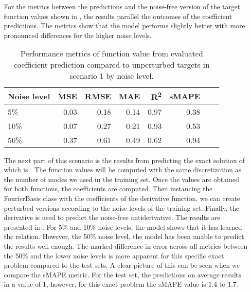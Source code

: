 For the metrics between the predictions and the noise-free version of the target function values shown in , the results parallel the outcomes of the coefficient predictions. The metrics show that the model performs slightly better with more pronounced differences for the higher noise levels.
\begin{table}[H]
  \caption{Performance metrics of function value from evaluated coefficient prediction compared to unperturbed targets in scenario 1 by noise level.}\label{table:scenario_1_clean_function_metrics}
  \centering
  \begin{tabular}{lrrrrrrr}
    \toprule
    Noise level & MSE  & RMSE & MAE  & R\textsuperscript{2} & sMAPE \\
    \midrule
    5\%         & 0.03 & 0.18 & 0.14 & 0.97                 & 0.38  \\
    10\%        & 0.07 & 0.27 & 0.21 & 0.93                 & 0.53  \\
    50\%        & 0.37 & 0.61 & 0.49 & 0.62                 & 0.94  \\
    \bottomrule
  \end{tabular}
\end{table}

The next part of this scenario is the results from predicting the exact solution of  which is . The function values will be computed with the same discretization as the number of modes we used in the training set. Once the values are obtained for both functions, the coefficients are computed. Then instancing the FourierBasis class with the coefficients of the derivative function, we can create perturbed versions according to the noise levels of the training set. Finally, the derivative is used to predict the noise-free antiderivative. The results are presented in . For 5\% and 10\% noise levels, the model shows that it has learned the relation. However, the 50\% noise level, the model has been unable to predict the results well enough. The marked difference in error across all metrics between the 50\% and the lower noise levels is more apparent for this specific exact problem compared to the test sets. A clear picture of this can be seen when we compare the sMAPE metric. For the test set, the predictions on average results in a value of 1, however, for this exact problem the sMAPE value is 1.4 to 1.7.

